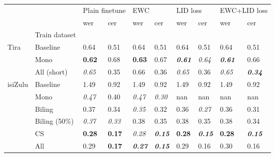\begin{tabular}{llllllllll}
\toprule
 &  & \multicolumn{2}{l}{Plain finetune} & \multicolumn{2}{l}{EWC} & \multicolumn{2}{l}{LID loss} & \multicolumn{2}{l}{EWC+LID loss} \\
 &  & wer & cer & wer & cer & wer & cer & wer & cer \\
 & Train dataset &  &  &  &  &  &  &  &  \\
\midrule
Tira & Baseline & 0.64 & 0.51 & 0.64 & 0.51 & 0.64 & 0.51 & 0.64 & 0.51 \\
 & Mono & \textbf{0.62} & 0.68 & \textbf{0.63} & 0.67 & \textit{\textbf{0.61}} & \textit{0.64} & \textit{\textbf{0.61}} & 0.66 \\
 & All (short) & \textit{0.65} & 0.35 & 0.66 & 0.36 & \textit{0.65} & 0.36 & \textit{0.65} & \textit{\textbf{0.34}} \\
\midrule
isiZulu & Baseline & 1.49 & 0.92 & 1.49 & 0.92 & 1.49 & 0.92 & 1.49 & 0.92 \\
 & Mono & \textit{0.47} & 0.40 & \textit{0.47} & \textit{0.30} & nan & nan & nan & nan \\
 & Biling & 0.37 & 0.34 & \textit{0.35} & 0.32 & 0.36 & \textit{0.27} & 0.36 & 0.31 \\
 & Biling (50\%) & \textit{0.37} & \textit{0.33} & 0.38 & 0.35 & 0.38 & 0.35 & 0.38 & 0.34 \\
 & CS & \textbf{0.28} & \textbf{0.17} & \textit{0.28} & \textit{\textbf{0.15}} & \textbf{0.28} & \textit{\textbf{0.15}} & \textbf{0.28} & \textit{\textbf{0.15}} \\
 & All & 0.29 & \textbf{0.17} & \textit{\textbf{0.27}} & \textit{\textbf{0.15}} & 0.29 & 0.16 & 0.30 & 0.16 \\
\bottomrule
\end{tabular}
